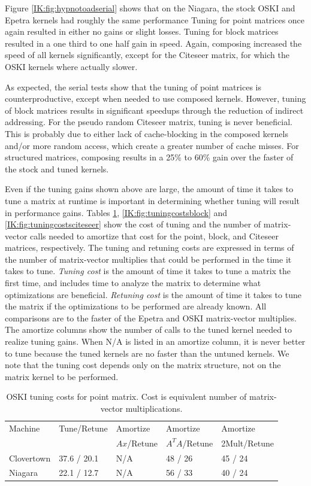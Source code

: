 Figure \ref{IK:fig:hypnotoadserial} shows that
on the Niagara, the stock OSKI and Epetra kernels had roughly the same performance
Tuning for point matrices once again resulted in either no gains or
slight losses. Tuning for block matrices resulted in a one third to one half gain in speed.  Again,
composing increased the speed of all kernels significantly, except for the Citeseer matrix, for which the
OSKI kernels where actually slower.

As expected, the serial tests show that the tuning of point matrices is counterproductive,
except when needed to use composed kernels.
However, tuning of block matrices results in significant speedups through the reduction of indirect addressing.  For the
pseudo random Citeseer matrix, tuning is never beneficial.  This is probably due to either lack of cache-blocking in the composed kernels
 and/or more random access, which create a greater number of cache misses.
For structured matrices, composing results in a 25\% to 60\% gain over the faster of the stock and tuned kernels.

Even if the tuning gains shown above are large, the amount of time it takes to tune a matrix at runtime is important in determining whether
tuning will result in performance gains.  Tables \ref{IK:fig:tuningcostspoint}, \ref{IK:fig:tuningcostsblock}
and \ref{IK:fig:tuningcostsciteseer} show the cost of tuning and the number of matrix-vector calls needed to amortize that cost for the point, block, and Citeseer matrices, respectively.
 The tuning and retuning costs are expressed in terms of
the number of matrix-vector multiplies that could be performed in the time it takes to tune.
{\it Tuning cost} is the amount of time it takes to tune a matrix the first time, and includes
time to analyze the matrix to determine what optimizations are beneficial.
{\it Retuning cost} is the amount of time it takes to tune the matrix if the optimizations
to be performed are already known.  All comparisons are to the faster of the Epetra and OSKI matrix-vector
multiplies.  The amortize columns show the number of calls to the tuned kernel needed to realize
tuning gains.  When N/A is listed in an amortize column, it is never better to tune
because the tuned kernels are no faster than the untuned kernels.
We note that the tuning cost depends only on the matrix structure, not on the matrix kernel to be
performed.
%
\begin{table}[htbp]
\centering
\begin{tabular}{|l|l|l|l|l|}
\hline
Machine & Tune/Retune & Amortize & Amortize & Amortize \\
 & & $Ax$/Retune & $A^TA$/Retune & 2Mult/Retune \\
\hline
Clovertown & 37.6 / 20.1 & N/A & 48 / 26 & 45 / 24 \\
Niagara & 22.1 / 12.7 & N/A & 56 / 33 & 40 / 24 \\
\hline
\end{tabular}
\caption{OSKI tuning costs for point matrix.  Cost is equivalent number of matrix-vector multiplications.} \label{IK:fig:tuningcostspoint}
\end{table}

